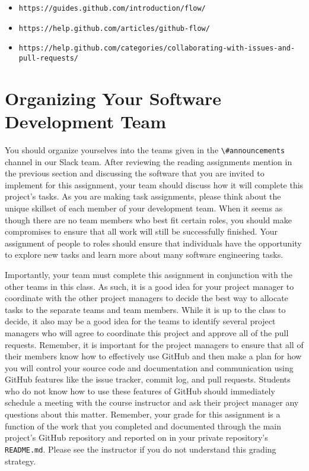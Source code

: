 \documentclass[11pt]{article}
\newcommand{\reflection}{\lstinline{README.md}}
\newcommand{\url}[1]{\lstinline{#1}}
\newcommand{\channel}[1]{\lstinline{#1}}
\begin{document}
\vspace*{-.5em}

\begin{itemize}
  \setlength{\itemsep}{0pt}
  \item \url{https://guides.github.com/introduction/flow/}
  \item \url{https://help.github.com/articles/github-flow/}
  \item \url{https://help.github.com/categories/collaborating-with-issues-and-pull-requests/}
\end{itemize}

\vspace*{-1em}

\section*{Organizing Your Software Development Team}

You should organize yourselves into the teams given in the \channel{\#announcements} channel in our Slack team. After
reviewing the reading assignments mention in the previous section and discussing the software that you are invited to
implement for this assignment, your team should discuss how it will complete this project's tasks. As you are making
task assignments, please think about the unique skillset of each member of your development team. When it seems as
though there are no team members who best fit certain roles, you should make compromises to ensure that all work will
still be successfully finished. Your assignment of people to roles should ensure that individuals have the opportunity
to explore new tasks and learn more about many software engineering tasks.

Importantly, your team must complete this assignment in conjunction with the other teams in this class. As such, it is a
good idea for your project manager to coordinate with the other project managers to decide the best way to allocate
tasks to the separate teams and team members. While it is up to the class to decide, it also may be a good idea for the
teams to identify several project managers who will agree to coordinate this project and approve all of the pull
requests. Remember, it is important for the project managers to ensure that all of their members know how to effectively
use GitHub and then make a plan for how you will control your source code and documentation and communication using
GitHub features like the issue tracker, commit log, and pull requests. Students who do not know how to use these
features of GitHub should immediately schedule a meeting with the course instructor and ask their project manager any
questions about this matter. Remember, your grade for this assignment is a function of the work that you completed and
documented through the main project's GitHub repository and reported on in your private repository's \reflection{}.
Please see the instructor if you do not understand this grading strategy.
\end{document}
